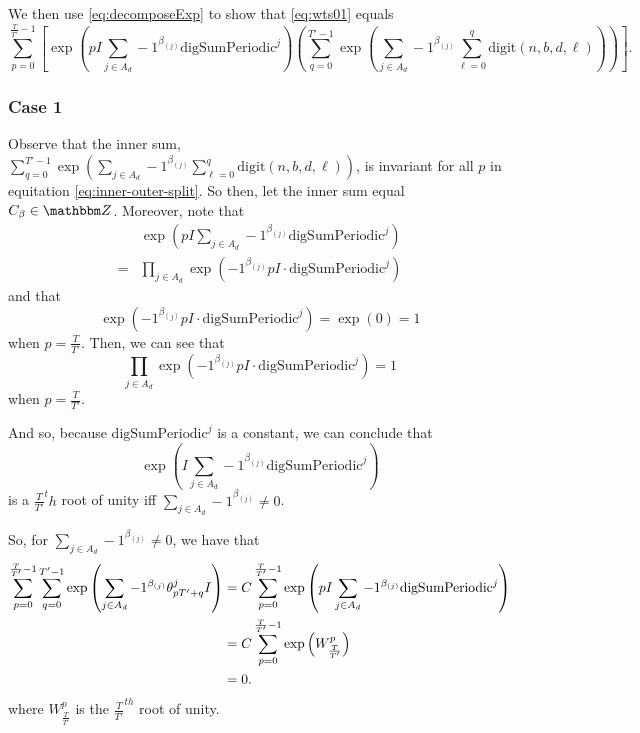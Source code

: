 \documentclass[11pt,titlepage]{article}
\newcommand{\rationalPeriodTotal}{{T}'}
\newcommand{\totalPeriod}{T}
\newcommand{\digSumPeriodic}{\mathrm{digSumPeriodic}^j}
\newcommand{\totalOverRationalFrac}{\frac{\totalPeriod}{\rationalPeriodTotal}}
\begin{document}
We then use \eqref{eq:decomposeExp} to show that \eqref{eq:wts01} equals
\begin{equation}
\label{eq:inner-outer-split}
  \sum_{p= 0}^{\frac{\totalPeriod}{\rationalPeriodTotal} - 1} \left[
    \exp\left(
      pI \sum_{j \in A_d} -1 ^ {\beta_{(j)}}
      \digSumPeriodic
    \right)
  \left(
  \sum_{q = 0}^{\rationalPeriodTotal - 1}
    \exp\left(
        \sum_{j \in A_d} -1 ^ {\beta_{(j)}}
          \sum_{\ell = 0}^{q}\mathrm{digit}(n, b, d, \ell)
    \right)\right)\right].
\end{equation}

\subsubsection*{Case 1}
Observe that the inner sum,
$
  \sum_{q = 0}^{\rationalPeriodTotal - 1}
  \exp\left(
      \sum_{j \in A_d} -1 ^ {\beta_{(j)}}
        \sum_{\ell = 0}^{q}\mathrm{digit}(n, b, d, \ell)
  \right)
$,
is invariant for all $p$ in equitation \eqref{eq:inner-outer-split}. So then,
let the inner sum equal $C_\beta \in \Z$.  Moreover, note that 
\begin{align*}
  &\exp\left(
      pI \sum_{j \in A_d} -1 ^ {\beta_{(j)}}
      \digSumPeriodic
    \right)\\
  =& \prod_{j \in A_d} \exp\left(-1^{\beta_{(j)}} pI \cdot \digSumPeriodic \right)
\end{align*}
and that 
\begin{equation*}
  \exp\left(-1^{\beta_{(j)}} pI \cdot \digSumPeriodic \right) = \exp\left(0\right) = 1
\end{equation*}
when $p = \frac{\totalPeriod}{\rationalPeriodTotal}$. Then, we can see that
$$
\prod_{j \in A_d} \exp\left(-1^{\beta_{(j)}} pI \cdot \digSumPeriodic \right) = 1
$$
when $p = \frac{\totalPeriod}{\rationalPeriodTotal}$.

And so, because $\digSumPeriodic$ is a constant, we can conclude that
\begin{equation*}
 \exp\left(
      I \sum_{j \in A_d} -1 ^ {\beta_{(j)}}
      \digSumPeriodic
    \right) 
\end{equation*}
is a $\totalOverRationalFrac^th$ root of unity iff $\sum_{j \in A_d} -1 ^ {\beta_{(j)}} \neq 0$.

So, for $\sum_{j \in A_d} -1 ^ {\beta_{(j)}} \neq 0$, we have that
\begin{align*}
  \eqWTSInnerProd &= C \sum_{p= 0}^{\frac{\totalPeriod}{\rationalPeriodTotal} - 1}
    \exp\left(
      pI \sum_{j \in A_d} -1 ^ {\beta_{(j)}}
      \digSumPeriodic
    \right) \\
    &= C \sum_{p = 0}^{\totalOverRationalFrac - 1}\exp\left(W_{\totalOverRationalFrac}^p\right) \\
    &= 0.
\end{align*}
where $W_{\totalOverRationalFrac}^p$ is the $\totalOverRationalFrac^{th}$ root of unity.
\end{document}
